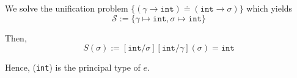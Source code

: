 \begin{Example}
    \vspace{1em}
    \noindent
    We solve the unification problem $\{(\gamma\to\texttt{int})\doteq (\texttt{int}\to\sigma)\}$ which yields\\
    $$\mathcal{S}:=\{\gamma\mapsto\texttt{int},\sigma\mapsto\texttt{int}\}$$
    
    \noindent
    Then, 
    $$S(\sigma):=[\texttt{int}/\sigma][\texttt{int}/\gamma](\sigma)=\texttt{int}$$
    
    \noindent
    Hence, (\texttt{int}) is the principal type of $e$. 
  \end{Example}
  